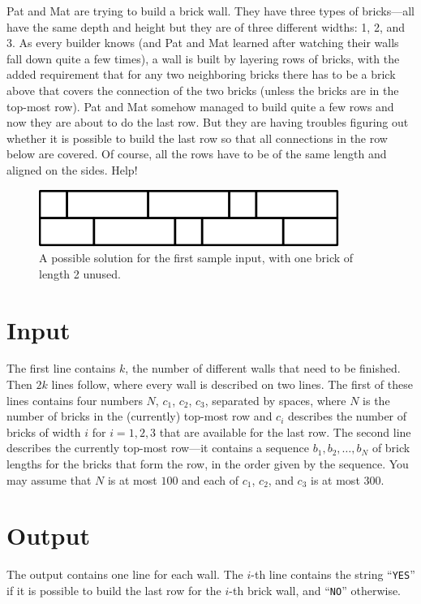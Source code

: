 
Pat and Mat are trying to build a brick wall. They have three types of
bricks---all have the same depth and height but they are of three
different widths: 1, 2, and 3. As every builder knows (and Pat and Mat
learned after watching their walls fall down quite a few times), a
wall is built by layering rows of bricks, with the added requirement
that for any two neighboring bricks there has to be a brick above that
covers the connection of the two bricks (unless the bricks are in the
top-most row). Pat and Mat somehow managed to build quite a few rows
and now they are about to do the last row. But they are having
troubles figuring out whether it is possible to build the last row so
that all connections in the row below are covered. Of course, all the
rows have to be of the same length and aligned on the sides. Help!

\begin{figure}[h]
  \centering
  \includegraphics{brickwall}
  \caption{A possible solution for the first sample input, with one brick
of length 2 unused.}
\label{fig:sample1}
\end{figure}

\section*{Input}

The first line contains $k$, the number of different walls that need
to be finished. Then $2k$ lines follow, where every wall is described
on two lines. The first of these lines contains four numbers $N$,
$c_1$, $c_2$, $c_3$, separated by spaces, where $N$ is the number of
bricks in the (currently) top-most row and $c_i$ describes the number
of bricks of width $i$ for $i = 1, 2, 3$ that are available for the
last row. The second line describes the currently top-most row---it
contains a sequence $b_1, b_2, \ldots, b_N$ of brick lengths for the
bricks that form the row, in the order given by the sequence. You may
assume that $N$ is at most $100$ and each of $c_1$, $c_2$, and $c_3$
is at most $300$.

\section*{Output}

The output contains one line for each wall. The $i$-th line contains
the string ``\verb+YES+'' if it is possible to build the last row for
the $i$-th brick wall, and ``\verb+NO+'' otherwise.
